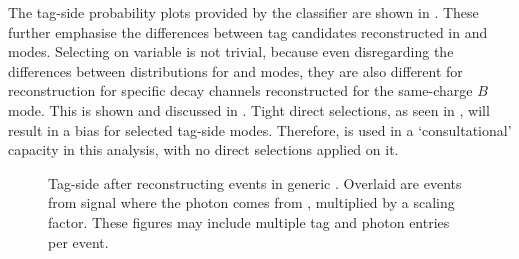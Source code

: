 The tag-side probability plots provided by the \FEI classifier are shown in .
These further emphasise the differences between tag candidates reconstructed in \FEI \Bp and \FEI \Bz modes.
Selecting on \feiProb variable is not trivial, 
because even disregarding the differences between distributions for \FEI \Bp and \Bz modes, 
they are also different for reconstruction for specific decay channels reconstructed for the same-charge $B$ mode.
This is shown and discussed in  .
Tight direct selections, as seen in , will result in a bias for selected tag-side modes.
Therefore, \feiProb is used in a `consultational' capacity in this analysis, with no direct selections applied on it.

\begin{figure}[htbp!]
    \centering
    \caption{\label{fig:sigprob_after_reco} Tag-side \feiProb after reconstructing \BtoXsgamma events in generic \MC.
    Overlaid are events from signal \MC where the photon comes from \BtoXsgamma, multiplied by a scaling factor.
    These figures may include multiple tag and photon entries per event.
    }
\end{figure}

